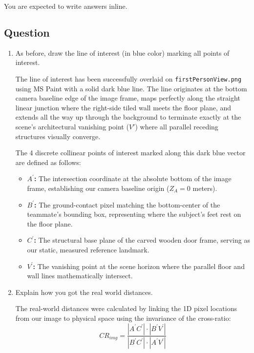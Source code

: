 You are expected to write answers inline.

\subsection{Question}
\begin{enumerate}

\item As before, draw the line of interest (in blue color) marking all points of interest.

\begin{studentSpace}
The line of interest has been successfully overlaid on \texttt{firstPersonView.png} using MS Paint with a solid dark blue line. The line originates at the bottom camera baseline edge of the image frame, maps perfectly along the straight linear junction where the right-side tiled wall meets the floor plane, and extends all the way up through the background to terminate exactly at the scene's architectural vanishing point ($V'$) where all parallel receding structures visually converge.

The 4 discrete collinear points of interest marked along this dark blue vector are defined as follows:
\begin{itemize}
    \item \textbf{$A^{\prime}$:} The intersection coordinate at the absolute bottom of the image frame, establishing our camera baseline origin ($Z_A = 0$ meters).
    \item \textbf{$B^{\prime}$:} The ground-contact pixel matching the bottom-center of the teammate's bounding box, representing where the subject's feet rest on the floor plane.
    \item \textbf{$C^{\prime}$:} The structural base plane of the carved wooden door frame, serving as our static, measured reference landmark.
    \item \textbf{$V^{\prime}$:} The vanishing point at the scene horizon where the parallel floor and wall lines mathematically intersect.
\end{itemize}
\end{studentSpace}
  
\item Explain how you got the real world distances.

\begin{studentSpace}
The real-world distances were calculated by linking the 1D pixel locations from our image to physical space using the invariance of the cross-ratio:
$$ CR_{img} = \frac{|A^{\prime}C^{\prime}| \cdot |B^{\prime}V^{\prime}|}{|B^{\prime}C^{\prime}| \cdot |A^{\prime}V^{\prime}|} $$


\end{studentSpace}
\end{enumerate}
